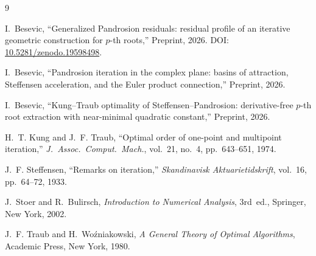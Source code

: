 \documentclass[10pt,a4paper,oneside]{book}
\theoremstyle{definition}
\theoremstyle{remark}
\begin{document}
\begin{thebibliography}{9}

I.~Besevic,
``Generalized Pandrosion residuals: residual profile of an iterative geometric construction for $p$-th roots,''
Preprint, 2026.
DOI: \href{https://doi.org/10.5281/zenodo.19598498}{10.5281/zenodo.19598498}.

I.~Besevic,
``Pandrosion iteration in the complex plane: basins of attraction, Steffensen acceleration, and the Euler product connection,''
Preprint, 2026.

I.~Besevic,
``Kung--Traub optimality of Steffensen--Pandrosion: derivative-free $p$-th root extraction with near-minimal quadratic constant,''
Preprint, 2026.

H.~T. Kung and J.~F. Traub,
``Optimal order of one-point and multipoint iteration,''
\textit{J.~Assoc.\ Comput.\ Mach.}, vol.~21, no.~4, pp.~643--651, 1974.

J.~F. Steffensen,
``Remarks on iteration,''
\textit{Skandinavisk Aktuarietidskrift}, vol.~16, pp.~64--72, 1933.

J.~Stoer and R.~Bulirsch,
\textit{Introduction to Numerical Analysis},
3rd~ed., Springer, New York, 2002.

J.~F. Traub and H.~Wo\'{z}niakowski,
\textit{A General Theory of Optimal Algorithms},
Academic Press, New York, 1980.

\end{thebibliography}







\end{document}
